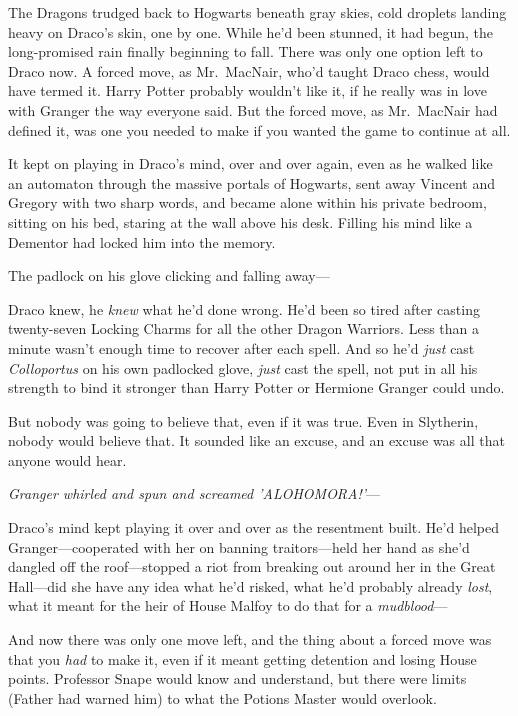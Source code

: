 The Dragons trudged back to Hogwarts beneath gray skies, cold droplets landing 
heavy on Draco's skin, one by one. While he'd been stunned, it had begun, the 
long-promised rain finally beginning to fall. There was only one option left to 
Draco now. A forced move, as Mr.~MacNair, who'd taught Draco chess, would have 
termed it. Harry Potter probably wouldn't like it, if he really was in love 
with Granger the way everyone said. But the forced move, as Mr.~MacNair had 
defined it, was one you needed to make if you wanted the game to continue at 
all.

It kept on playing in Draco's mind, over and over again, even as he walked like 
an automaton through the massive portals of Hogwarts, sent away Vincent and 
Gregory with two sharp words, and became alone within his private bedroom, 
sitting on his bed, staring at the wall above his desk. Filling his mind like a 
Dementor had locked him into the memory.

The padlock on his glove clicking and falling away---

Draco knew, he \emph{knew} what he'd done wrong. He'd been so tired after 
casting twenty-seven Locking Charms for all the other Dragon Warriors. Less 
than a minute wasn't enough time to recover after each spell. And so he'd 
\emph{just} cast \emph{Colloportus} on his own padlocked glove, \emph{just} 
cast the spell, not put in all his strength to bind it stronger than Harry 
Potter or Hermione Granger could undo.

But nobody was going to believe that, even if it was true. Even in Slytherin, 
nobody would believe that. It sounded like an excuse, and an excuse was all 
that anyone would hear.

\emph{Granger whirled and spun and screamed 'ALOHOMORA!'}---

Draco's mind kept playing it over and over as the resentment built. He'd helped 
Granger---cooperated with her on banning traitors---held her hand as she'd 
dangled off the roof---stopped a riot from breaking out around her in the Great 
Hall---did she have any idea what he'd risked, what he'd probably already 
\emph{lost}, what it meant for the heir of House Malfoy to do that for a 
\emph{mudblood}---

And now there was only one move left, and the thing about a forced move was 
that you \emph{had} to make it, even if it meant getting detention and losing 
House points. Professor Snape would know and understand, but there were limits 
(Father had warned him) to what the Potions Master would overlook.

